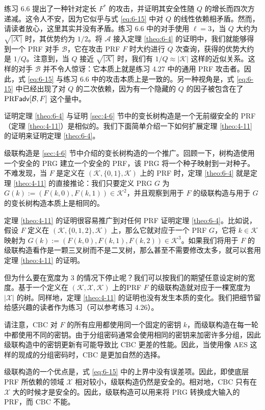 练习 6.6 提出了一种针对定长 $F^*$ 的攻击，并证明其安全性随 $Q$ 的增长而四次方递减。这令人不安，因为它似乎与式 \ref{eq:6-15} 中对 $Q$ 的线性依赖相矛盾。然而，请读者放心，这里其实并没有矛盾。练习 6.6 中的对手使用 $\ell=3$，当 $Q$ 大约为 $\sqrt{|\mathcal{K}|}$ 时，其优势约为 $1/2$。将 $\mathcal{A}$ 接入定理 \ref{theo:6-4} 的证明中，我们就能够得到一个 PRF 对手 $\mathcal{B}$，它在攻击 PRF $F$ 时大约进行 $Q$ 次查询，获得的优势大约是 $1/Q$。注意到，当 $Q$ 接近 $\sqrt{|\mathcal{K}|}$ 时，我们有 $1/Q\approx|\mathcal{K}|$ 这样的近似关系。这样的对手 $\mathcal{B}$ 并不令人惊讶：它本质上就是练习 4.27 中的通用 PRF 攻击者。因此，式 \ref{eq:6-15} 与练习 6.6 中的攻击本质上是一致的。另一种视角是，式 \ref{eq:6-15} 中已经出现了对 $Q$ 的二次依赖，因为有一个隐藏的 $Q$ 的因子被包含在了 ${\rm PRF\mathsf{adv}}[\mathcal{B},F]$ 这个量中。

\vspace{5pt}

证明定理 \ref{theo:6-4} 与证明 \ref{sec:4-6} 节中的变长树构造是一个无前缀安全的 PRF（定理 \ref{theo:4-11}）是相似的。我们下面简单介绍一下如何扩展定理 \ref{theo:4-11} 的证明来证明定理 \ref{theo:6-4}。

\begin{snote}[与树构造的关系。]
级联构造是 \ref{sec:4-6} 节中介绍的变长树构造的一个推广。回顾一下，树构造使用一个安全的 PRG 建立一个安全的 PRF，该 PRG 将一个种子映射到一对种子。不难发现，当 $F$ 是定义在 $(\mathcal{K},\{0,1\},\mathcal{K})$ 上的 PRF 时，定理 \ref{theo:6-4} 就是定理 \ref{theo:4-11} 的直接推论：我们只要定义 PRG $G$ 为 $G(k):=(F(k,0),F(k,1))\in\mathcal{K}^2$，并且观察到用于 $F$ 的级联构造与用于 $G$ 的变长树构造本质上是相同的。

定理 \ref{theo:4-11} 的证明很容易推广到对任何 PRF 证明定理 \ref{theo:6-4}。比如说，假设 $F$ 定义在 $(\mathcal{K},\{0,1,2\},\mathcal{K})$ 上，那么它就对应于一个 PRF $G$，它将 $k\in\mathcal{K}$ 映射为 $G(k):=(F(k,0),F(k,1),F(k,2))\in\mathcal{K}^3$。如果我们将用于 $F$ 的级联构造看作是一颗三叉树而不是二叉树，那么甚至不需要修改太多，就可以套用定理 \ref{theo:4-11} 的证明。

但为什么要在宽度为 $3$ 的情况下停止呢？我们可以按我们的期望任意设定树的宽度。基于一个定义在 $(\mathcal{K},\mathcal{X},\mathcal{K})$ 上的PRF $F$ 的级联构造就对应于一棵宽度为 $|\mathcal{X}|$ 的树。同样地，定理 \ref{theo:4-11} 的证明也没有发生本质的变化。我们把细节留给感兴趣的读者作为练习（可以参考练习 4.26）。
\end{snote}

\begin{snote}
请注意，CBC 对 $F$ 的所有应用都使用同一个固定的密钥 $k$，而级联构造在每一轮中都使用不同的密钥。由于分组密码通常会使用相同的密钥来加密许多分组，因此级联构造中的密钥更新有可能导致比 CBC 更差的性能。因此，当使用像 AES 这样的现成的分组密码时，CBC 是更加自然的选择。

级联构造的一个优点是，式 \ref{eq:6-15} 中的上界中没有误差项。因此，即使底层 PRF 所依赖的领域 $\mathcal{X}$ 相对较小，级联构造仍然是安全的。相对地，CBC 只有在 $\mathcal{X}$ 大的时候才是安全的。因此，级联构造可以用来将 PRG 转换成大输入的 PRF，而 CBC 不能。
\end{snote}

